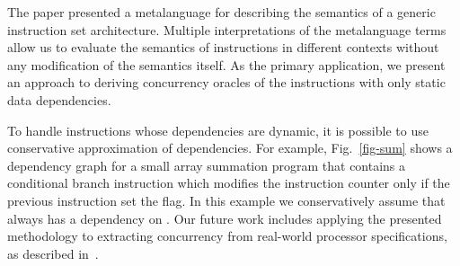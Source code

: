 The paper presented a metalanguage for describing the semantics of a generic
instruction set architecture.
Multiple interpretations of the metalanguage terms allow us to evaluate the
semantics of instructions in different contexts without any modification of the
semantics itself. As the primary application, we present an approach to deriving
concurrency oracles of the instructions with only static data dependencies.

To handle instructions whose dependencies are dynamic, it is possible to use
conservative approximation of dependencies. For example, Fig.~\ref{fig-sum}
shows a dependency graph for a small array summation program that contains
a conditional branch instruction  which modifies the instruction
counter  only if the previous instruction set the  flag. In
this example we conservatively assume that  always has a dependency
on . Our future work includes applying the presented methodology to
extracting concurrency from real-world processor specifications, as described
in~\cite{mokhov2018formal}.

